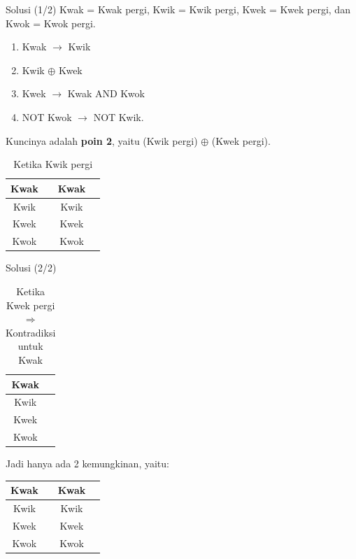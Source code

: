 \documentclass[english,t]{beamer}
\newcommand{\cmark}{\ding{51}}%
\newcommand{\xmark}{\ding{55}}%
\begin{document}
\begin{frame}{Solusi (1/2)}
Kwak = Kwak pergi, Kwik = Kwik pergi, Kwek = Kwek pergi, dan Kwok = Kwok pergi.
\begin{enumerate}
	\item Kwak $\longrightarrow$ Kwik 
	\item Kwik $\oplus$ Kwek
	\item Kwek $\longrightarrow$ Kwak AND Kwok 
	\item NOT Kwok $\longrightarrow$ NOT Kwik.
\end{enumerate}

Kuncinya adalah \textbf{poin 2}, yaitu (Kwik pergi) $\oplus$ (Kwek pergi).

\begin{table}[!ht]
	\centering
	\caption{Ketika Kwik pergi}
	\begin{tabular}{|cc|cc|}
		\hline
		Kwak & \cmark & Kwak & \xmark \\
		\hline 	
		Kwik & \cmark & Kwik & \cmark \\
		\hline
		Kwek & \xmark & Kwek & \xmark \\
		\hline
		Kwok & \cmark & Kwok & \cmark \\
		\hline		
	\end{tabular}
\end{table}  
\end{frame}

\begin{frame}{Solusi (2/2)}
\begin{table}[!ht]
	\centering
	\caption{Ketika Kwek pergi $\Rightarrow$ Kontradiksi untuk Kwak}
	\begin{tabular}{|cc|}
		\hline
		Kwak  & \xmark \\
		\hline 	
		Kwik & \xmark  \\
		\hline
		Kwek & \cmark  \\
		\hline
		Kwok & \cmark  \\
		\hline		
	\end{tabular}
\end{table}  
Jadi hanya ada 2 kemungkinan, yaitu:
\begin{table}[!ht]
	\centering
	\begin{tabular}{|cc|cc|}
		\hline
		Kwak & \cmark & Kwak & \xmark \\
		\hline 	
		Kwik & \cmark & Kwik & \cmark \\
		\hline
		Kwek & \xmark & Kwek & \xmark \\
		\hline
		Kwok & \cmark & Kwok & \cmark \\
		\hline		
	\end{tabular}
\end{table}  
\end{frame}
\end{document}
